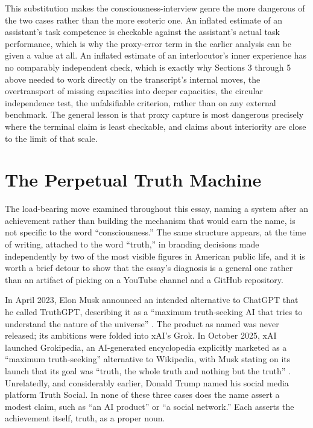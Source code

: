 \documentclass[11pt]{article}
\begin{document}
This substitution makes the consciousness-interview genre the more dangerous of the two cases rather than the more esoteric one. An inflated estimate of an assistant's task competence is checkable against the assistant's actual task performance, which is why the proxy-error term in the earlier analysis can be given a value at all. An inflated estimate of an interlocutor's inner experience has no comparably independent check, which is exactly why Sections 3 through 5 above needed to work directly on the transcript's internal moves, the overtransport of missing capacities into deeper capacities, the circular independence test, the unfalsifiable criterion, rather than on any external benchmark. The general lesson is that proxy capture is most dangerous precisely where the terminal claim is least checkable, and claims about interiority are close to the limit of that scale.

\section{The Perpetual Truth Machine}

The load-bearing move examined throughout this essay, naming a system after an achievement rather than building the mechanism that would earn the name, is not specific to the word ``consciousness.'' The same structure appears, at the time of writing, attached to the word ``truth,'' in branding decisions made independently by two of the most visible figures in American public life, and it is worth a brief detour to show that the essay's diagnosis is a general one rather than an artifact of picking on a YouTube channel and a GitHub repository.

In April 2023, Elon Musk announced an intended alternative to ChatGPT that he called TruthGPT, describing it as a ``maximum truth-seeking AI that tries to understand the nature of the universe'' \citep{cnbc2023truthgpt}. The product as named was never released; its ambitions were folded into xAI's Grok. In October 2025, xAI launched Grokipedia, an AI-generated encyclopedia explicitly marketed as a ``maximum truth-seeking'' alternative to Wikipedia, with Musk stating on its launch that its goal was ``truth, the whole truth and nothing but the truth'' \citep{foxbusiness2025grokipedia}. Unrelatedly, and considerably earlier, Donald Trump named his social media platform Truth Social. In none of these three cases does the name assert a modest claim, such as ``an AI product'' or ``a social network.'' Each asserts the achievement itself, truth, as a proper noun.
\end{document}

